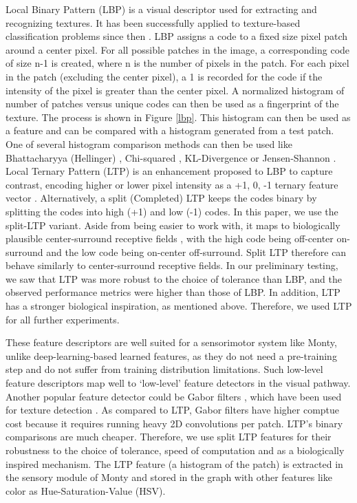 \documentclass[runningheads]{llncs}
\begin{document}
Local Binary Pattern (LBP) \cite{ojala2000gray} is a visual descriptor used for extracting and recognizing textures. It has been successfully applied to texture-based classification problems since then \cite{pietikainen2011computer,ke2013research,huang2011local}. LBP assigns a code to a fixed size pixel patch around a center pixel. For all possible patches in the image, a corresponding code of size n-1 is created, where n is the number of pixels in the patch.  For each pixel in the patch (excluding the center pixel), a 1 is recorded for the code if the intensity of the pixel is greater than the center pixel. A normalized histogram of number of patches versus unique codes can then be used as a fingerprint of the texture. The process is shown in Figure \ref{lbp}. This histogram can then be used as a feature and can be compared with a histogram generated from a test patch. One of several histogram comparison methods can then be used like Bhattacharyya (Hellinger) \cite{bhattacharyya1943measure,hellinger1909neue}, Chi-squared \cite{pearson1900criterion}, KL-Divergence \cite{kullback1951information} or Jensen-Shannon \cite{lin1991divergence}. Local Ternary Pattern (LTP) is an enhancement proposed to LBP to capture contrast, encoding higher or lower pixel intensity as a +1, 0, -1 ternary feature vector \cite{tan2007enhanced}. Alternatively, a split (Completed) LTP \cite{rassem2014completed} keeps the codes binary by splitting the codes into high (+1) and low (-1) codes. In this paper, we use the split-LTP variant. Aside from being easier to work with, it maps to biologically plausible center-surround receptive fields \cite{kuffler1953discharge}, with the high code being off-center on-surround and the low code being on-center off-surround. Split LTP therefore can behave similarly to center-surround receptive fields. 
In our preliminary testing, we saw that LTP was more robust to the choice of tolerance than LBP, and the observed performance metrics were higher than those of LBP. In addition, LTP has a stronger biological inspiration, as mentioned above. Therefore, we used LTP for all further experiments.

These feature descriptors are well suited for a sensorimotor system like Monty, unlike deep-learning-based learned features, as they do not need a pre-training step and do not suffer from training distribution limitations. Such low-level feature descriptors map well to ‘low-level’ feature detectors in the visual pathway. Another popular feature detector could be Gabor filters \cite{gabor1946theory}, which have been used for texture detection \cite{grigorescu2002comparison,arivazhagan2006texture}. As compared to LTP, Gabor filters have higher comptue cost because it requires running heavy 2D convolutions per patch. LTP's binary comparisons are much cheaper. Therefore, we use split LTP features for their robustness to the choice of tolerance, speed of computation and as a biologically inspired mechanism. The LTP feature (a histogram of the patch) is extracted in the sensory module of Monty and stored in the graph with other features like color as Hue-Saturation-Value (HSV).  
\end{document}
